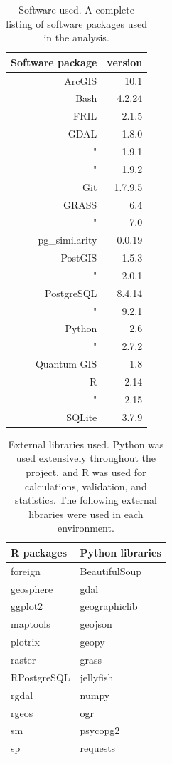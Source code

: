 \begin{table}[htbp]
  \caption[Software used]{Software used. A complete listing of software packages used in the analysis.}
  \ssp
  \centering
  \begin{tabular}{rr}
    \hline
    Software package & version \\
    \hline
     \textsf{ArcGIS} & 10.1 \\
     \textsf{Bash} & 4.2.24 \\ 
     \textsf{FRIL} & 2.1.5 \\
     \textsf{GDAL} & 1.8.0 \\
                 " & 1.9.1 \\
                 " & 1.9.2 \\
     \textsf{Git} & 1.7.9.5 \\
     \textsf{GRASS} & 6.4 \\
                  " & 7.0 \\
     \textsf{pg\_similarity} & 0.0.19 \\
     \textsf{PostGIS} & 1.5.3 \\
                    " & 2.0.1 \\
     \textsf{PostgreSQL} & 8.4.14 \\
                      "  & 9.2.1 \\
     \textsf{Python} & 2.6 \\
                   " & 2.7.2 \\
     \textsf{Quantum GIS} & 1.8 \\
     \textsf{R} & 2.14 \\
              " & 2.15 \\
     \textsf{SQLite} & 3.7.9 \\
  \end{tabular}
  \label{table:software-used-versions}
\end{table}

\begin{table}
  \caption[Libraries used]{External libraries used. Python was used extensively throughout the project, and R was used for calculations, validation, and statistics. The following external libraries were used in each environment.}
  \centering
  \ssp
  \begin{tabular}{ll}
    \hline
    R packages & Python libraries \\
    \hline
    foreign & BeautifulSoup\\
    geosphere & gdal \\
    ggplot2 & geographiclib \\
    maptools & geojson \\
    plotrix & geopy \\
    raster & grass\\
    RPostgreSQL & jellyfish \\
    rgdal & numpy \\
    rgeos & ogr \\
    sm & psycopg2 \\
    sp & requests \\
  \end{tabular}
\end{table}


